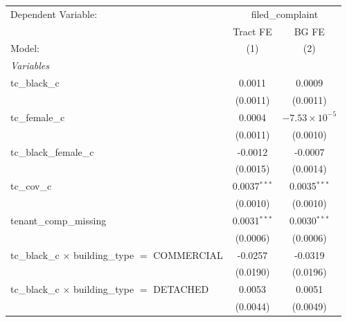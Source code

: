 \begingroup
\centering
\begin{tabular}{lcc}
   \tabularnewline \midrule \midrule
   Dependent Variable: & \multicolumn{2}{c}{filed\_complaint}\\
                                                                       & Tract FE       & BG FE \\   
   Model:                                                              & (1)            & (2)\\  
   \midrule
   \emph{Variables}\\
   tc\_black\_c                                                        & 0.0011         & 0.0009\\   
                                                                       & (0.0011)       & (0.0011)\\   
   tc\_female\_c                                                       & 0.0004         & $-7.53\times 10^{-5}$\\    
                                                                       & (0.0011)       & (0.0010)\\   
   tc\_black\_female\_c                                                & -0.0012        & -0.0007\\   
                                                                       & (0.0015)       & (0.0014)\\   
   tc\_cov\_c                                                          & 0.0037$^{***}$ & 0.0035$^{***}$\\   
                                                                       & (0.0010)       & (0.0010)\\   
   tenant\_comp\_missing                                               & 0.0031$^{***}$ & 0.0030$^{***}$\\   
                                                                       & (0.0006)       & (0.0006)\\   
   tc\_black\_c $\times$ building\_type $=$ COMMERCIAL                 & -0.0257        & -0.0319\\   
                                                                       & (0.0190)       & (0.0196)\\   
   tc\_black\_c $\times$ building\_type $=$ DETACHED                   & 0.0053         & 0.0051\\   
                                                                       & (0.0044)       & (0.0049)\\   

\end{tabular}
